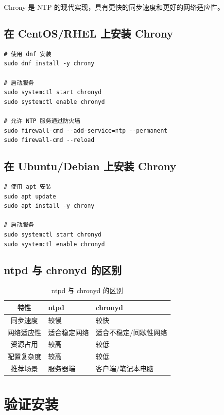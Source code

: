 \documentclass[12pt,UTF8]{ctexbook}
\begin{document}
Chrony 是 NTP 的现代实现，具有更快的同步速度和更好的网络适应性。

\subsection{在 CentOS/RHEL 上安装 Chrony}

\begin{verbatim}
# 使用 dnf 安装
sudo dnf install -y chrony

# 启动服务
sudo systemctl start chronyd
sudo systemctl enable chronyd

# 允许 NTP 服务通过防火墙
sudo firewall-cmd --add-service=ntp --permanent
sudo firewall-cmd --reload
\end{verbatim}

\subsection{在 Ubuntu/Debian 上安装 Chrony}

\begin{verbatim}
# 使用 apt 安装
sudo apt update
sudo apt install -y chrony

# 启动服务
sudo systemctl start chronyd
sudo systemctl enable chronyd
\end{verbatim}

\subsection{ntpd 与 chronyd 的区别}

\begin{table}[htbp]
    \centering
    \caption{ntpd 与 chronyd 的区别}
    \begin{tabular}{|c|p{4cm}|p{4cm}|}
        \hline
        \textbf{特性} & \textbf{ntpd} & \textbf{chronyd} \\
        \hline
        同步速度 & 较慢 & 较快 \\
        \hline
        网络适应性 & 适合稳定网络 & 适合不稳定/间歇性网络 \\
        \hline
        资源占用 & 较高 & 较低 \\
        \hline
        配置复杂度 & 较高 & 较低 \\
        \hline
        推荐场景 & 服务器端 & 客户端/笔记本电脑 \\
        \hline
    \end{tabular}
\end{table}

\section{验证安装}
\label{sec:verify_install}
\end{document}
